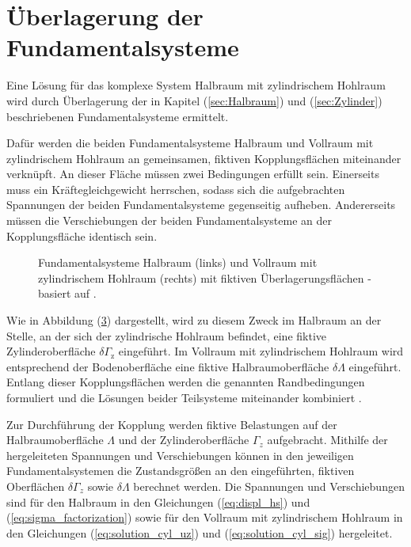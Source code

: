 \section{Überlagerung der Fundamentalsysteme}
\label{sec:Superposition}

Eine Lösung für das komplexe System Halbraum mit zylindrischem Hohlraum wird durch Überlagerung der in Kapitel (\ref{sec:Halbraum}) und (\ref{sec:Zylinder}) beschriebenen Fundamentalsysteme ermittelt.

Dafür werden die beiden Fundamentalsysteme Halbraum und Vollraum mit zylindrischem Hohlraum an gemeinsamen, fiktiven Kopplungsflächen miteinander verknüpft. 
An dieser Fläche müssen zwei Bedingungen erfüllt sein. 
Einerseits muss ein Kräftegleichgewicht herrschen, sodass sich die aufgebrachten Spannungen der beiden Fundamentalsysteme gegenseitig aufheben. 
Andererseits müssen die Verschiebungen der beiden Fundamentalsysteme an der Kopplungsfläche identisch sein.
\begin{figure}[H]
	\hspace*{5mm}
	\centering
	\begin{subfigure}[t]{0.48\textwidth}
		\centering
		
		\label{fig:Halbraum_fiktiveFlächen}
	\end{subfigure}\hfill
	\begin{subfigure}[t]{0.48\textwidth}
		\centering
		
		\label{fig:Zylinder_fiktiveFlächen}
	\end{subfigure}
	\caption{Fundamentalsysteme Halbraum (links) und Vollraum mit zylindrischem Hohlraum (rechts) mit fiktiven Überlagerungsflächen - basiert auf \cite{Freisinger2022}.}
	\label{fig:Überlagerung_fiktiveFlächen}
\end{figure}
Wie in Abbildung (\ref{fig:Überlagerung_fiktiveFlächen}) dargestellt, wird zu diesem Zweck im Halbraum an der Stelle, an der sich der zylindrische Hohlraum befindet, eine fiktive Zylinderoberfläche $\delta\Gamma_{\mathrm z}$ eingeführt. Im Vollraum mit zylindrischem Hohlraum wird entsprechend der Bodenoberfläche eine fiktive Halbraumoberfläche $\delta\Lambda$ eingeführt. 
Entlang dieser Kopplungsflächen werden die genannten Randbedingungen formuliert und die Lösungen beider Teilsysteme miteinander kombiniert \citep{Mueller2007}.
 
 Zur Durchführung der Kopplung werden fiktive Belastungen auf der Halbraumoberfläche $\Lambda$ und der Zylinderoberfläche $\Gamma_z$ aufgebracht. 
 Mithilfe der hergeleiteten Spannungen und Verschiebungen können in den jeweiligen Fundamentalsystemen die Zustandsgrößen an den eingeführten, fiktiven Oberflächen $\delta\Gamma_z$ sowie $\delta\Lambda$ berechnet werden.
 Die Spannungen und Verschiebungen sind für den Halbraum in den Gleichungen (\ref{eq:displ_hs}) und (\ref{eq:sigma_factorization}) sowie für den Vollraum mit zylindrischem Hohlraum in den Gleichungen (\ref{eq:solution_cyl_uz}) und (\ref{eq:solution_cyl_sig}) hergeleitet.
 
